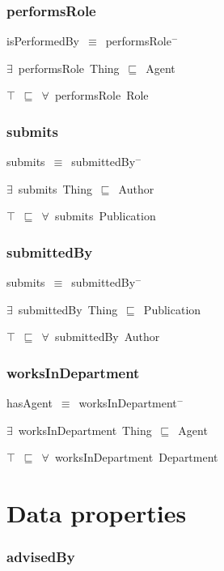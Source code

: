 \documentclass{article}
\begin{document}
\subsubsection*{performsRole}

isPerformedBy~\ensuremath{\equiv}~performsRole\ensuremath{^-}

\ensuremath{\exists}~performsRole~Thing~\ensuremath{\sqsubseteq}~Agent

\ensuremath{\top}~\ensuremath{\sqsubseteq}~\ensuremath{\forall}~performsRole~Role

\subsubsection*{submits}

submits~\ensuremath{\equiv}~submittedBy\ensuremath{^-}

\ensuremath{\exists}~submits~Thing~\ensuremath{\sqsubseteq}~Author

\ensuremath{\top}~\ensuremath{\sqsubseteq}~\ensuremath{\forall}~submits~Publication

\subsubsection*{submittedBy}

submits~\ensuremath{\equiv}~submittedBy\ensuremath{^-}

\ensuremath{\exists}~submittedBy~Thing~\ensuremath{\sqsubseteq}~Publication

\ensuremath{\top}~\ensuremath{\sqsubseteq}~\ensuremath{\forall}~submittedBy~Author

\subsubsection*{worksInDepartment}

hasAgent~\ensuremath{\equiv}~worksInDepartment\ensuremath{^-}

\ensuremath{\exists}~worksInDepartment~Thing~\ensuremath{\sqsubseteq}~Agent

\ensuremath{\top}~\ensuremath{\sqsubseteq}~\ensuremath{\forall}~worksInDepartment~Department

\section*{Data properties}\subsubsection*{advisedBy}
\end{document}
